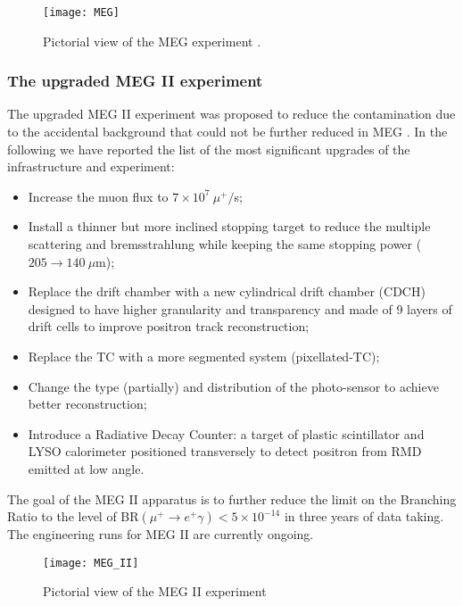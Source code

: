 \documentclass[12pt,a4paper,openright, oneside, titlepage]{book} %
\begin{document}
\begin{figure}[h!]
\centering
\texttt{[image: MEG]}
\caption{Pictorial view of the MEG experiment \cite{Chiappini}\cite{MEG}.}
\label{_MEG}
\end{figure}

\subsubsection{The upgraded MEG II experiment} 

\noindent
The upgraded MEG II experiment was proposed to reduce the contamination due to the accidental background 
that could not be further reduced in MEG \cite{MEG_upgrade} \cite{MEG_II}.
In the following we have reported the list of the most significant upgrades of the infrastructure and experiment:

\begin{itemize}
\item Increase the muon flux to $7\times10^7\ \mu^+/$s;
\item Install a thinner but more inclined stopping target to reduce the multiple scattering and bremsstrahlung 
while keeping the same stopping power ($205 \rightarrow 140\ \mu$m);
\item Replace the drift chamber with a new cylindrical drift chamber (CDCH) designed  
to have higher granularity and transparency and made of 9 layers of drift cells to improve positron track reconstruction; 
\item Replace the TC with a more segmented system (pixellated-TC);
\item Change the type (partially) and distribution of the photo-sensor to achieve better reconstruction;
\item Introduce a Radiative Decay Counter: a target of plastic scintillator and LYSO calorimeter positioned transversely to detect positron from RMD emitted at low angle.
\end{itemize}
The goal of the MEG II apparatus is to further reduce the limit on the Branching Ratio to the level of BR$(\mu^+\rightarrow e^+\gamma)<5\times10^{-14}$ in three years of data taking. 
The engineering runs for MEG II are currently ongoing.

\begin{figure}[h!]
\centering
\texttt{[image: MEG\_II]}
\caption{Pictorial view of the MEG II experiment \cite{MEG_II}}
\label{_MEG_II}
\end{figure}
\end{document}
